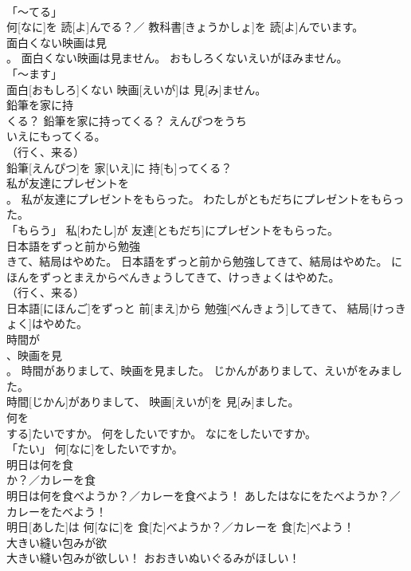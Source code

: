 \documentclass[8pt]{extreport}
\begin{document}
\begin{CJK}{UTF8}{min}
\\	「～てる」 
\\	何[なに]を 読[よ]んでる？／ 教科書[きょうかしょ]を 読[よ]んでいます。		
\\	面白くない映画は見
\\	。	面白くない映画は見ません。	おもしろくないえいがほみません。	
\\	「～ます」 
\\	面白[おもしろ]くない 映画[えいが]は 見[み]ません。		
\\	鉛筆を家に持
\\	くる？	鉛筆を家に持ってくる？	えんぴつを{うち
\\	いえ}にもってくる。	
\\	（行く、来る） 
\\	鉛筆[えんぴつ]を 家[いえ]に 持[も]ってくる？		
\\	私が友達にプレゼントを
\\	。	私が友達にプレゼントをもらった。	わたしがともだちにプレゼントをもらった。	
\\	「もらう」	私[わたし]が 友達[ともだち]にプレゼントをもらった。		
\\	日本語をずっと前から勉強
\\	きて、結局はやめた。	日本語をずっと前から勉強してきて、結局はやめた。	にほんをずっとまえからべんきょうしてきて、けっきょくはやめた。	
\\	（行く、来る） 
\\	日本語[にほんご]をずっと 前[まえ]から 勉強[べんきょう]してきて、 結局[けっきょく]はやめた。		
\\	時間が
\\	、映画を見
\\	。	時間がありまして、映画を見ました。	じかんがありまして、えいがをみました。	
\\	時間[じかん]がありまして、 映画[えいが]を 見[み]ました。		
\\	何を
\\	する]たいですか。	何をしたいですか。	なにをしたいですか。	
\\	「たい」	何[なに]をしたいですか。		
\\	明日は何を食
\\	か？／カレーを食
\\	明日は何を食べようか？／カレーを食べよう！	あしたはなにをたべようか？／カレーをたべよう！	
\\	明日[あした]は 何[なに]を 食[た]べようか？／カレーを 食[た]べよう！		
\\	大きい縫い包みが欲
\\	大きい縫い包みが欲しい！	おおきいぬいぐるみがほしい！	

\end{CJK}
\end{document}
